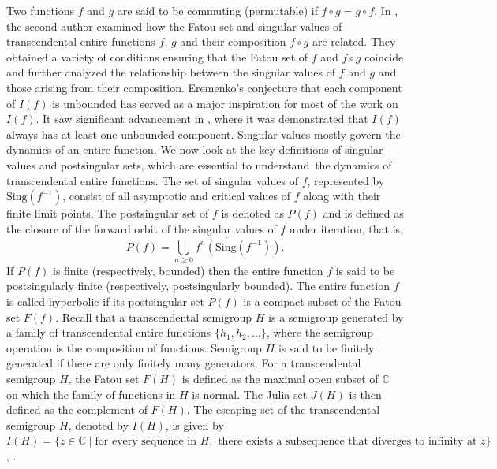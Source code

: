 \documentclass[a4paper,12pt]{amsart}
\newcommand{\C}{\mathbb{C}}
\numberwithin{equation}{section}
\begin{document}
	Two functions $f$ and $g$ are said to be commuting (permutable) if
	$f \circ g = g \circ f$. In \cite{kumar2013dynamics}, the second author examined how the Fatou set and singular	values of transcendental entire functions $f$, $g$ and their composition $f \circ g$ are related. They obtained a variety of conditions ensuring that the Fatou set of $f$ and $f \circ g$ coincide and further analyzed the relationship between the singular values of $f$ and $g$ and those arising from their composition. Eremenko's conjecture \cite{eremenko1989iteration} that each component of $I(f)$ is unbounded has served as a major inspiration for most of the work on $I(f)$. It saw significant advancement in \cite{rippon2005questions}, where it was demonstrated that $I(f)$ always has at least one unbounded component. 
Singular values mostly govern the dynamics of an entire function. We now look at the key definitions of singular values and postsingular sets, which are essential to understand the dynamics of transcendental entire functions. The set of singular values of $f$, represented by $\mathrm{Sing}(f^{-1})$, consist of all asymptotic and critical values of $f$ along with their finite limit points. The postsingular set of $f$ is denoted as $P(f)$ and is defined as the closure of the forward orbit of the singular values of $f$ under iteration, that is,\[P(f)=\overline{\bigcup_{n \geq 0} f^n(\mathrm{Sing}(f^{-1}))}.\] If $P(f)$ is finite (respectively, bounded) then the entire function $f$ is said to be postsingularly finite (respectively, postsingularly bounded).
 The entire function $f$ is called hyperbolic if its postsingular set $P(f)$ is a compact subset of the Fatou set $F(f)$. Recall that a transcendental semigroup $H$ is a semigroup generated by a family of transcendental entire functions $\{h_1,h_2,\dots \}$, where the semigroup operation is the composition of functions. Semigroup $H$ is said to be finitely generated if there are only finitely many generators. For a transcendental semigroup $H$, the Fatou set $F(H)$ is defined as the maximal open subset of $\C$ on which the family of functions in $H$ is normal. The Julia set $J(H)$ is then defined as the complement of $F(H)$. The escaping set of the transcendental semigroup $H$, denoted by $I(H)$, is given by
 $I(H) = \{ z \in \C \mid \text{for every sequence in } H, \text{ there exists a subsequence that diverges to infinity at } z \}$, \cite{kumar2016dynamics}.\\
\end{document}
